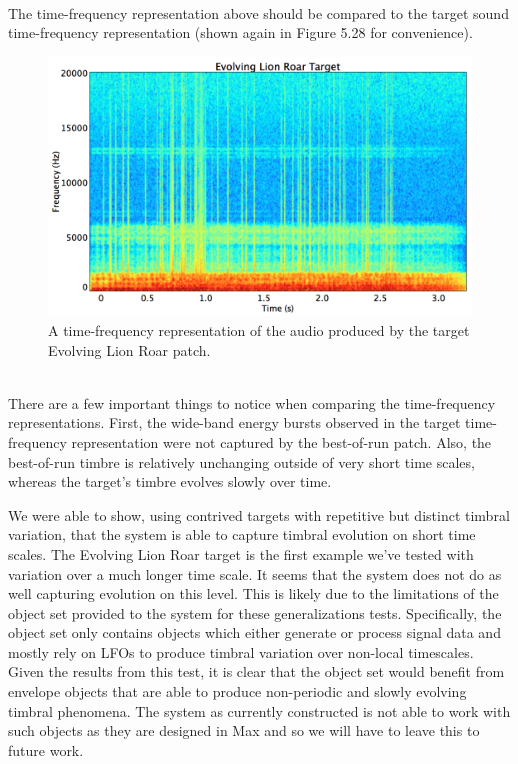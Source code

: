 \documentclass[a4paper,12pt]{report} 	%
\numberwithin{figure}{chapter}
\numberwithin{table}{chapter}
\numberwithin{equation}{chapter}
\begin{document}
\begin{flushleft}
\begin{figure}[h!]
\begin{center}
\end{center}
\end{figure}
\\
The time-frequency representation above should be compared to the target sound time-frequency representation (shown again in Figure 5.28 for convenience).
\begin{figure}[h!]
\begin{center}
\includegraphics[scale=0.35,width=\linewidth]{EvolvingLionRoarTargetSTFT}
\caption[Target Evolving Lion Roar Time-Frequency Representation]{A time-frequency representation of the audio produced by the target Evolving Lion Roar patch.}
\end{center}
\end{figure}
\\
There are a few important things to notice when comparing the time-frequency representations. First, the wide-band energy bursts observed in the target time-frequency representation were not captured by the best-of-run patch. Also, the best-of-run timbre is relatively unchanging outside of very short time scales, whereas the target's timbre evolves slowly over time. 

We were able to show, using contrived targets with repetitive but distinct timbral variation, that the system is able to capture timbral evolution on short time scales. The Evolving Lion Roar target is the first example we've tested with variation over a much longer time scale. It seems that the system does not do as well capturing evolution on this level. This is likely due to the limitations of the object set provided to the system for these generalizations tests. Specifically, the object set only contains objects which either generate or process signal data and mostly rely on LFOs to produce timbral variation over non-local timescales. Given the results from this test, it is clear that the object set would benefit from envelope objects that are able to produce non-periodic and slowly evolving timbral phenomena. The system as currently constructed is not able to work with such objects as they are designed in Max and so we will have to leave this to future work.


\end{flushleft}
\end{document}
